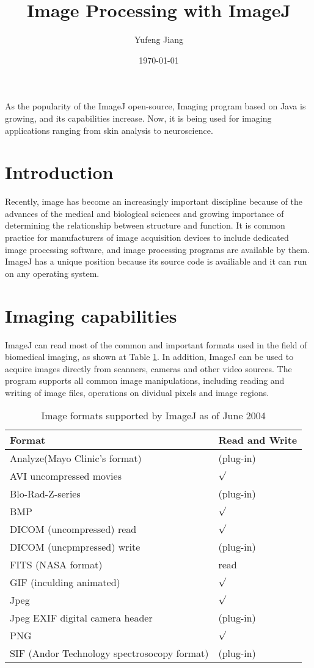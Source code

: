 \documentclass[a4paper]{article}
\title{Image Processing with ImageJ}
\author{Yufeng Jiang}
\date{\today}
\begin{document}
\maketitle
As the popularity of the ImageJ open-source, Imaging program based on Java is growing, and its capabilities increase. Now, it is being used for imaging applications ranging from skin analysis to neuroscience.\\
\begin{multicols}{2}
\balance
\section{Introduction}
Recently, image has become an increasingly important discipline because of the advances of the medical and biological sciences and growing importance of determining the relationship between structure and function. It is common practice for manufacturers of image acquisition devices to include dedicated image processing software, and image processing programs are available by them. ImageJ has a unique position because its source code is availiable and it can run on any operating system.\\
\section{Imaging capabilities}
ImageJ can read most of the common and important formats used in the field of biomedical imaging, as shown at Table \ref{tab1}. In addition, ImageJ can be used to acquire images directly from scanners, cameras and other video sources. The program supports all common image manipulations, including reading and writing of image files, operations on dividual pixels and image regions.\cite{ImageJ}\\
\begin{table}[H]
\centering
\caption{Image formats supported by ImageJ as of June 2004}
\label{tab1}
\begin{tabular}{|p{10em}|p{4em}|}
  \hline
  Format &  Read and Write \\ \hline
  Analyze(Mayo Clinic's format) & (plug-in) \\ \hline
  AVI uncompressed movies & $\surd$ \\ \hline
  Blo-Rad-Z-series & (plug-in) \\ \hline
  BMP & $\surd$ \\ \hline
  DICOM (uncompressed) read & $\surd$ \\ \hline
  DICOM (uncpmpressed) write & (plug-in) \\ \hline
  FITS (NASA format) & read \\ \hline
  GIF (inculding animated) & $\surd$ \\ \hline
  Jpeg & $\surd$ \\ \hline
  Jpeg EXIF digital camera header & (plug-in) \\ \hline
  PNG & $\surd$ \\ \hline
  SIF (Andor Technology spectrosocopy format) & (plug-in) \\ \hline
\end{tabular}
\end{table}

\end{multicols}
\end{document}
